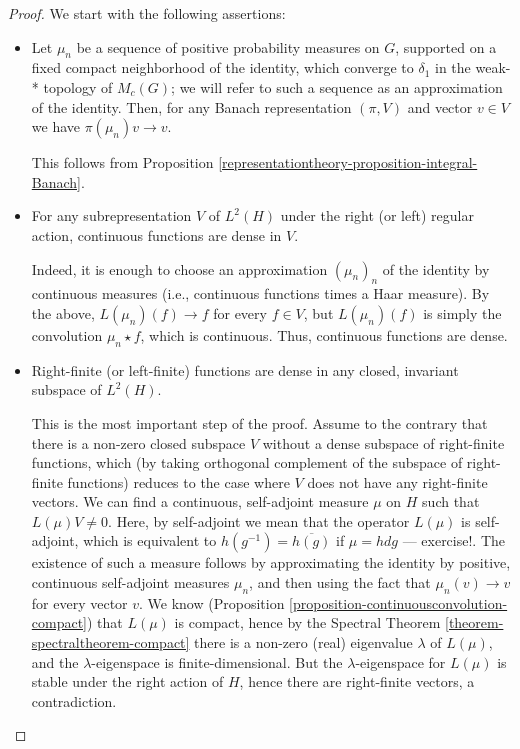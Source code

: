 \begin{proof}
We start with the following assertions:  

\begin{itemize}
 \item Let $\mu_n$ be a sequence of positive probability measures on $G$, supported on a fixed compact neighborhood of the identity,  which converge to $\delta_1$ in the weak-* topology of $M_c(G)$; we will refer to such a sequence as an approximation of the identity. Then, for any Banach representation $(\pi,V)$ and vector $v\in V$ we have $\pi(\mu_n)v\to v$.
 
 This follows from Proposition \ref{representationtheory-proposition-integral-Banach}.
 
 
 \item For any subrepresentation $V$ of $L^2(H)$ under the right (or left) regular action, continuous functions are dense in $V$. 

Indeed, it is enough to choose an approximation $(\mu_n)_n$ of the identity by continuous measures (i.e., continuous functions times a Haar measure). By the above, $L(\mu_n)(f)\to f$ for every $f\in V$, but $L(\mu_n)(f)$ is simply the convolution $\mu_n\star f$, which is continuous. Thus, continuous functions are dense. 

\item Right-finite (or left-finite) functions are dense in any closed, invariant subspace of $L^2(H)$. 

This is the most important step of the proof. Assume to the contrary that there is a non-zero closed subspace $V$ without a dense subspace of right-finite functions, which (by taking orthogonal complement of the subspace of right-finite functions) reduces to the case where $V$ does not have any right-finite vectors. We can find a continuous, self-adjoint measure $\mu$ on $H$ such that $L(\mu)V\ne 0$. Here, by self-adjoint we mean that the operator $L(\mu)$ is self-adjoint, which is equivalent to $h(g^{-1})=\overline{h(g)}$ if $\mu=hdg$ --- exercise!. The existence of such a measure follows by approximating the identity by positive, continuous self-adjoint measures $\mu_n$, and then using the fact that $\mu_n(v)\to v$ for every vector $v$.  We know (Proposition \ref{proposition-continuousconvolution-compact}) that $L(\mu)$ is compact, hence by the Spectral Theorem \ref{theorem-spectraltheorem-compact} there is a non-zero (real) eigenvalue $\lambda$ of $L(\mu)$, and the $\lambda$-eigenspace is finite-dimensional. But the $\lambda$-eigenspace for $L(\mu)$ is stable under the right action of $H$, hence there are right-finite vectors, a contradiction.


\end{itemize}
\end{proof}
